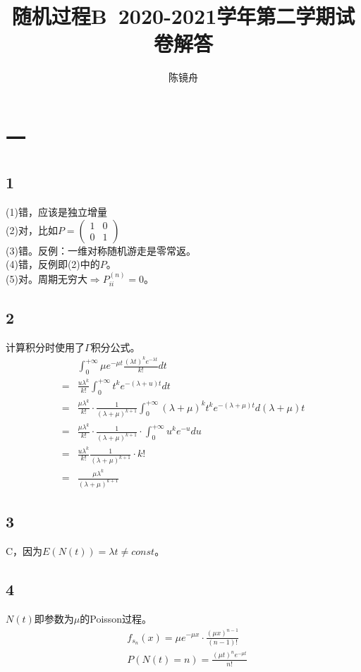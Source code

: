 \documentclass{article}
\title{随机过程B\ 2020-2021学年第二学期试卷解答}
\author{陈镜舟}
\begin{document}
    \maketitle
    \setlength{\parindent}{0pt}
    \section*{一}
    \subsection*{1}
    (1)错，应该是独立增量\\
    (2)对，比如$P=\begin{pmatrix}1&0\\0&1\end{pmatrix}$\\
    (3)错。反例：一维对称随机游走是零常返。\\
    (4)错，反例即(2)中的$P$。\\
    (5)对。周期无穷大$\Rightarrow P_{ii}^{(n)}=0$。
    \subsection*{2}
    计算积分时使用了$\Gamma$积分公式。
    \begin{align*}
        &\int_{0}^{+\infty}\mu e^{-\mu t} \frac{(\lambda t)^{k}e^{-\lambda t}}{k!}dt\\
        =&\frac{u\lambda^{k}}{k!}\int_{0}^{+\infty}t^{k}e^{-(\lambda+u)t}dt\\
        =&\frac{\mu\lambda^{k}}{k!}\cdot\frac{1}{(\lambda+\mu)^{k+1}}\int_{0}^{+\infty}(\lambda+\mu)^{k}t^{k}e^{-(\lambda+\mu)t}d(\lambda+\mu)t\\
        =&\frac{\mu\lambda^{k}}{k!}\cdot\frac{1}{(\lambda+\mu)^{k+1}}\cdot\int_{0}^{+\infty}u^{k}e^{-u}du\\
        =&\frac{u\lambda^{k}}{k!}\frac{1}{(\lambda+\mu)^{k+1}}\cdot k!\\
        =&\frac{\mu\lambda^{k}}{(\lambda+\mu)^{k+1}}
    \end{align*}
    \subsection*{3}
    C，因为$E(N(t))=\lambda t\neq const$。\\
    \subsection*{4}
    $N(t)$即参数为$\mu$的Poisson过程。
    \begin{align*}
        &f_{s_{n}}(x)=\mu e^{-\mu x}\cdot\frac{(\mu x)^{n-1}}{(n-1)!}\\
        &P(N(t)=n)=\frac{(\mu t)^{n}e^{-\mu t}}{n!}
    \end{align*}
\end{document}
